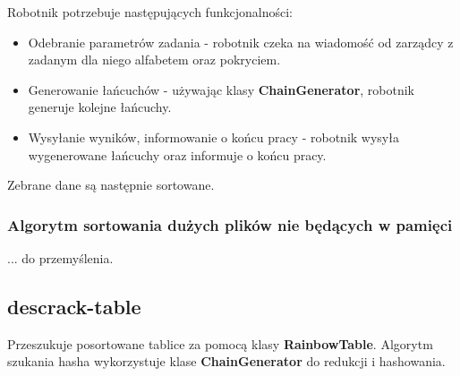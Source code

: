 \documentclass[a4paper,11pt]{article}
\begin{document}
Robotnik potrzebuje następujących funkcjonalności:
\begin{itemize}
	\item Odebranie parametrów zadania - robotnik czeka na wiadomość od zarządcy z zadanym dla niego alfabetem oraz pokryciem.
	\item Generowanie łańcuchów - używając klasy \textbf{ChainGenerator}, robotnik generuje kolejne łańcuchy.
	\item Wysyłanie wyników, informowanie o końcu pracy - robotnik wysyła wygenerowane łańcuchy oraz informuje o końcu pracy.
\end{itemize}

Zebrane dane są następnie sortowane.

\subsubsection{Algorytm sortowania dużych plików nie będących w pamięci}

... do przemyślenia.

\subsection{descrack-table}

Przeszukuje posortowane tablice za pomocą klasy \textbf{RainbowTable}. Algorytm szukania hasha wykorzystuje klase \textbf{ChainGenerator} do redukcji i hashowania.
\end{document}
